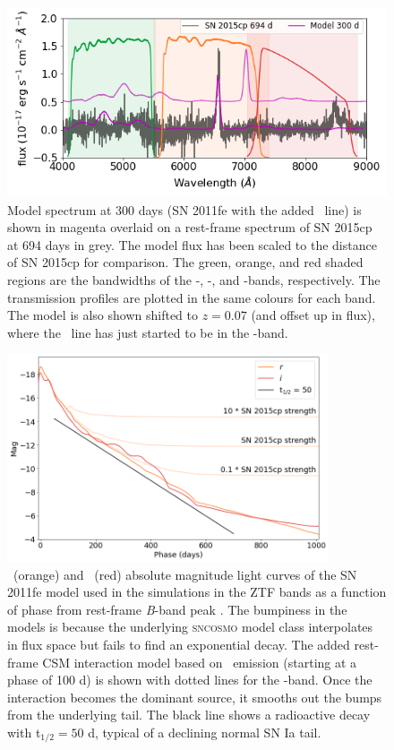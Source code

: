 \documentclass[a4paper,oneside,12pt, class=Latex/Classes/PhDthesisPSnPDF, crop=false]{standalone}
\begin{document}
\begin{figure}
 \centering
 \includegraphics[width=\textwidth]{../Images/chapter_3/Model_15cp_comparison.png}
 \caption{Model spectrum at 300 days (SN 2011fe with the added \Halpha~line) is shown in magenta overlaid on a rest-frame spectrum of SN 2015cp at 694 days in grey. The model flux has been scaled to the distance of SN 2015cp for comparison. The green, orange, and red shaded regions are the bandwidths of the \ztfg-, \ztfr-, and \ztfi-bands, respectively. The transmission profiles are plotted in the same colours for each band. The model is also shown shifted to $z = 0.07$ (and offset up in flux), where the \Halpha~line has just started to be in the \ztfi-band.}
 \label{mod_15cp_comp}
\end{figure}

\begin{figure}
 \centering
 \includegraphics[width=0.846\textwidth]{../Images/chapter_3/11fe_mods.png}
 \caption{\ztfr\ (orange) and \ztfi\ (red) absolute magnitude light curves of the SN 2011fe model used in the simulations in the ZTF bands as a function of phase from rest-frame \textit{B}-band peak \citep{spec_HST}. The bumpiness in the models is because the underlying \textsc{sncosmo} model class interpolates in flux space but fails to find an exponential decay. The added rest-frame CSM interaction model based on \Halpha~emission (starting at a phase of 100 d) is shown with dotted lines for the \ztfr-band. Once the interaction becomes the dominant source, it smooths out the bumps from the underlying tail. The black line shows a radioactive decay with t$_{1/2}=50$ d, typical of a declining normal SN Ia tail.}
 \label{11fe_mods}
\end{figure}
\end{document}
